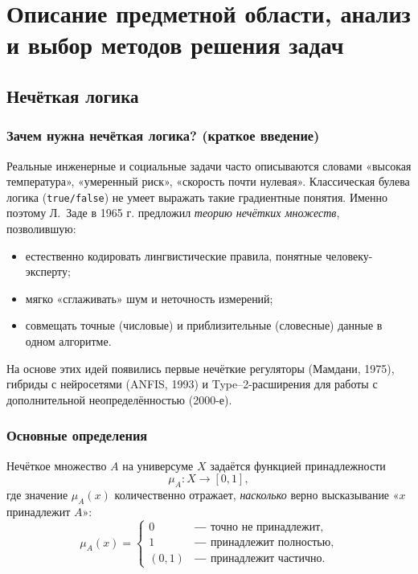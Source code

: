 \section{Описание предметной области, анализ и выбор методов решения задач}


\subsection{Нечёткая логика}

\subsubsection{Зачем нужна нечёткая логика? (краткое введение)}
Реальные инженерные и социальные задачи часто описываются словами  
«высокая температура», «умеренный риск», «скорость почти нулевая».  
Классическая булева логика (\texttt{true/false}) не умеет выражать такие
градиентные понятия.  
Именно поэтому Л.~Заде в 1965 г. предложил \emph{теорию нечётких
множеств}, позволившую:
\begin{itemize}
  \item естественно кодировать лингвистические правила,
        понятные человеку-эксперту;
  \item мягко «сглаживать» шум и неточность измерений;
  \item совмещать точные (числовые) и приблизительные (словесные) данные
        в одном алгоритме.
\end{itemize}
На основе этих идей появились первые нечёткие регуляторы
(Мамдани, 1975), гибриды с нейросетями (ANFIS, 1993) и
Type–2-расширения для работы с дополнительной неопределённостью
(2000-е).

\subsubsection{Основные определения}

\begin{definition}
Нечёткое множество $A$ на универсуме $X$ задаётся функцией принадлежности
\begin{equation}
  \mu_A\colon X \longrightarrow [0,1],
  \label{eq:fuzzy_set_def}
\end{equation}
где значение $\mu_A(x)$ количественно отражает,
\emph{насколько} верно высказывание «$x$ принадлежит $A$»:
\[
  \mu_A(x)=
  \begin{cases}
    0          &\text{― точно не принадлежит},\\
    1          &\text{― принадлежит полностью},\\
    (0,1)      &\text{― принадлежит частично}.
  \end{cases}
\]
\end{definition}

